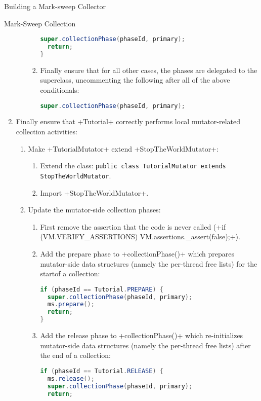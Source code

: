 \begin{chapter}{Building a Mark-sweep Collector}
\begin{section}{Mark-Sweep Collection}
\begin{enumerate}
\begin{enumerate}
\begin{enumerate}
\begin{lstlisting}[language=Java]
  super.collectionPhase(phaseId, primary);
  return;
}
             \end{lstlisting}
           \item Finally ensure that for all other cases, the phases are delegated to the superclass, uncommenting the following after all of the above conditionals:
             \begin{lstlisting}[language=Java]
super.collectionPhase(phaseId, primary);
             \end{lstlisting}
         \end{enumerate}
    \end{enumerate} 
  \item Finally ensure that \spverb+Tutorial+ correctly performs local mutator-related collection activities:
    \begin{enumerate}
      \item Make \spverb+TutorialMutator+ extend \spverb+StopTheWorldMutator+:
        \begin{enumerate}
          \item Extend the class: \texttt{pu\-blic class Tu\-to\-rial\-Mu\-ta\-tor ex\-tends Stop\-The\-World\-Mu\-ta\-tor}.
          \item Import \spverb+StopTheWorldMutator+.
        \end{enumerate}
      \item Update the mutator-side collection phases:
        \begin{enumerate}
          \item First remove the assertion that the code is never called (\spverb+if (VM.VERIFY_ASSERTIONS) VM.assertions._assert(false);+).
          \item Add the prepare phase to \spverb+collectionPhase()+ which prepares mutator-side data structures (namely the per-thread free lists) for the startof a collection:
            \begin{lstlisting}[language=Java]
if (phaseId == Tutorial.PREPARE) {
  super.collectionPhase(phaseId, primary);
  ms.prepare();
  return;
}
            \end{lstlisting}
          \item Add the release phase to \spverb+collectionPhase()+ which re-initializes mutator-side data structures (namely the per-thread free lists) after the end of a collection:
            \begin{lstlisting}[language=Java]
if (phaseId == Tutorial.RELEASE) {
  ms.release();
  super.collectionPhase(phaseId, primary);
  return;

\end{lstlisting}
\end{enumerate}
\end{enumerate}
\end{enumerate}
\end{section}
\end{chapter}
